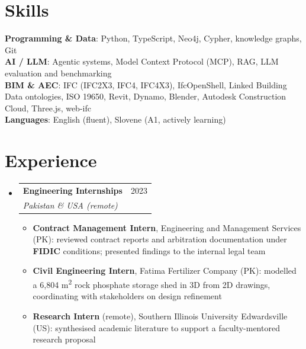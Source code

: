 \documentclass[a4paper,11pt]{article}
\makeatletter
\newcommand{\resumeItem}[1]{
  \item\small{
    {#1 \vspace{-2pt}}
  }
}
\newcommand{\resumeSubheading}[4]{
  \vspace{-2pt}\item
    \begin{tabular*}{0.97\textwidth}[t]{l@{\extracolsep{\fill}}r}
      \textbf{#1} & #2 \\
      \textit{\small#3} & \textit{\small #4} \\
    \end{tabular*}\vspace{-9pt}
}
\newcommand{\resumeSubHeadingListStart}{\begin{itemize}[leftmargin=0.15in, label={}]}
\newcommand{\resumeSubHeadingListEnd}{\end{itemize}}
\newcommand{\resumeItemListStart}{\begin{itemize}[itemsep=1pt]}
\newcommand{\resumeItemListEnd}{\end{itemize}\vspace{-7pt}}
\makeatother
\begin{document}
\section{Skills}
 \begin{itemize}[leftmargin=0.15in, label={}]
    \small{\item{
     \textbf{Programming \& Data}{: Python, TypeScript, Neo4j, Cypher, knowledge graphs, Git} \\
     \textbf{AI / LLM}{: Agentic systems, Model Context Protocol (MCP), RAG, LLM evaluation and benchmarking} \\
     \textbf{BIM \& AEC}{: IFC (IFC2X3, IFC4, IFC4X3), IfcOpenShell, Linked Building Data ontologies, ISO 19650, Revit, Dynamo, Blender, Autodesk Construction Cloud, Three.js, web-ifc} \\
     \textbf{Languages}{: English (fluent), Slovene (A1, actively learning)}
    }}
 \end{itemize}


\section{Experience}
  \resumeSubHeadingListStart
    \resumeSubheading
      {Engineering Internships}{2023}
      {Pakistan \& USA (remote)}{}
      \resumeItemListStart
        \resumeItem{\textbf{Contract Management Intern}, Engineering and Management Services (PK): reviewed contract reports and arbitration documentation under \textbf{FIDIC} conditions; presented findings to the internal legal team}
        \resumeItem{\textbf{Civil Engineering Intern}, Fatima Fertilizer Company (PK): modelled a 6,804 m\textsuperscript{2} rock phosphate storage shed in 3D from 2D drawings, coordinating with stakeholders on design refinement}
        \resumeItem{\textbf{Research Intern} (remote), Southern Illinois University Edwardsville (US): synthesised academic literature to support a faculty-mentored research proposal}
      \resumeItemListEnd

  \resumeSubHeadingListEnd




\end{document}
